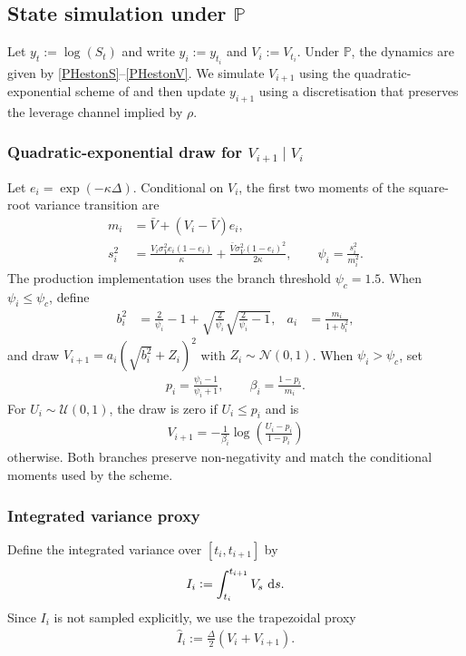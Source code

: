 \documentclass[11pt,a4paper,notitlepage]{article}
\numberwithin{equation}{section}
\begin{document}
\subsection{State simulation under $\mathbb{P}$}
Let $y_t:=\log(S_t)$ and write $y_i:=y_{t_i}$ and $V_i:=V_{t_i}$. Under $\mathbb{P}$,
the dynamics are given by \eqref{PHestonS}--\eqref{PHestonV}.
We simulate $V_{i+1}$ using the quadratic-exponential scheme of \citet{andersen2008simple} and then update $y_{i+1}$ using a discretisation that preserves the leverage channel implied by $\rho$.

\subsubsection{Quadratic-exponential draw for $V_{i+1}\mid V_i$}
Let $e_i=\exp(-\kappa\Delta)$. Conditional on $V_i$, the first two moments of the square-root variance transition are
\begin{align}
m_i &= \bar V+(V_i-\bar V)e_i, \\
s_i^2 &= \frac{V_i\sigma_V^2e_i(1-e_i)}{\kappa}
+\frac{\bar V\sigma_V^2(1-e_i)^2}{2\kappa},
\qquad
\psi_i=\frac{s_i^2}{m_i^2}.
\label{eq:qe_moments}
\end{align}
The production implementation uses the branch threshold $\psi_c=1.5$. When $\psi_i\leq\psi_c$, define
\begin{align}
b_i^2&=\frac{2}{\psi_i}-1+\sqrt{\frac{2}{\psi_i}}\sqrt{\frac{2}{\psi_i}-1},
&a_i&=\frac{m_i}{1+b_i^2},
\end{align}
and draw $V_{i+1}=a_i(\sqrt{b_i^2}+Z_i)^2$ with $Z_i\sim\mathcal N(0,1)$. When $\psi_i>\psi_c$, set
\begin{align}
p_i=\frac{\psi_i-1}{\psi_i+1},
\qquad
\beta_i=\frac{1-p_i}{m_i}.
\end{align}
For $U_i\sim\mathcal U(0,1)$, the draw is zero if $U_i\leq p_i$ and is
\begin{align}
V_{i+1}=-\frac{1}{\beta_i}\log\left(\frac{U_i-p_i}{1-p_i}\right)
\end{align}
otherwise. Both branches preserve non-negativity and match the conditional moments used by the scheme.

\subsubsection{Integrated variance proxy}
Define the integrated variance over $[t_i,t_{i+1}]$ by
\begin{align}
I_i := \int_{t_i}^{t_{i+1}} V_s\,\dif s.
\end{align}
Since $I_i$ is not sampled explicitly, we use the trapezoidal proxy
\begin{align}
\widehat{I}_i := \frac{\Delta}{2}\left(V_i+V_{i+1}\right).
\label{eq:I_trap}
\end{align}
\end{document}
